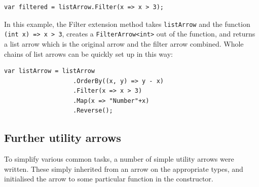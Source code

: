 \documentclass[12pt,twoside,notitlepage]{report}
\begin{document}
\begin{lstlisting}[language={[Sharp]C}]
var filtered = listArrow.Filter(x => x > 3);
\end{lstlisting}

In this example, the Filter extension method takes \texttt{listArrow} and the function \texttt{(int x) => x > 3}, creates a \texttt{FilterArrow<int>} out of the function, and returns a list arrow which is the original arrow and the filter arrow combined. Whole chains of list arrows can be quickly set up in this way:

\begin{lstlisting}[language={[Sharp]C}]
var listArrow = listArrow
                   .OrderBy((x, y) => y - x)
                   .Filter(x => x > 3)
                   .Map(x => "Number"+x)
                   .Reverse();
\end{lstlisting}




\subsection{Further utility arrows} \label{sec:further_utility_arrows}

To simplify various common tasks, a number of simple utility arrows were written. These simply inherited from an arrow on the appropriate types, and initialised the arrow to some particular function in the constructor.
\end{document}
